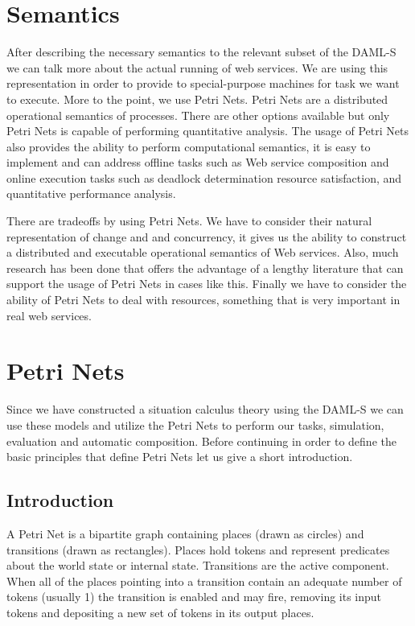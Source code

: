 \section*{Semantics}
After describing the necessary semantics to the relevant subset of the DAML-S we can talk more about the actual running of web services. We are using this representation in order to provide to special-purpose machines for task we want to execute. More to the point, we use Petri Nets. Petri Nets are a distributed operational semantics of processes. There are other options available but only Petri Nets is capable of performing quantitative analysis. The usage of Petri Nets also provides the ability to perform computational semantics, it is easy to implement and can address offline tasks such as Web service composition and online execution tasks such as deadlock determination resource satisfaction, and quantitative performance analysis.

There are tradeoffs by using Petri Nets. We have to consider their natural representation of change and and concurrency, it gives us the ability to construct a distributed and executable operational semantics of Web services.
Also, much research has been done that offers the advantage of a lengthy literature that can support the usage of Petri Nets in cases like this. Finally we have to consider the ability of Petri Nets to deal with resources, something that is very important in real web services.

\section*{Petri Nets}
Since we have constructed a situation calculus theory using the DAML-S we can use these models and utilize the Petri Nets to perform our tasks, simulation, evaluation and automatic composition. Before continuing in order to define the basic principles that define Petri Nets let us give a short introduction.

\subsection*{Introduction}
A Petri Net is a bipartite graph containing places (drawn as circles) and transitions (drawn as rectangles). Places hold tokens and represent predicates about the world state or internal state. Transitions are the active component. When all of the places pointing into a transition contain an adequate number of tokens (usually 1) the transition is enabled and may fire, removing its input tokens and depositing a new set of tokens in its output places.

